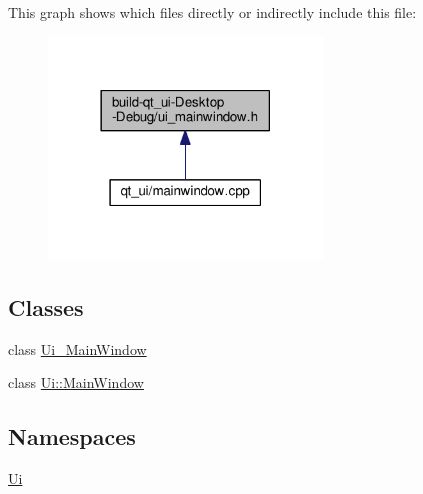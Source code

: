 This graph shows which files directly or indirectly include this file\+:
\nopagebreak
\begin{figure}[H]
\begin{center}
\leavevmode
\includegraphics[width=206pt]{qt__ui-_desktop-_debug_2ui__mainwindow_8h__dep__incl}
\end{center}
\end{figure}
\subsection*{Classes}
\begin{DoxyCompactItemize}
\item 
class \hyperlink{class_ui___main_window}{Ui\+\_\+\+Main\+Window}
\item 
class \hyperlink{class_ui_1_1_main_window}{Ui\+::\+Main\+Window}
\end{DoxyCompactItemize}
\subsection*{Namespaces}
\begin{DoxyCompactItemize}
\item 
 \hyperlink{namespace_ui}{Ui}
\end{DoxyCompactItemize}
